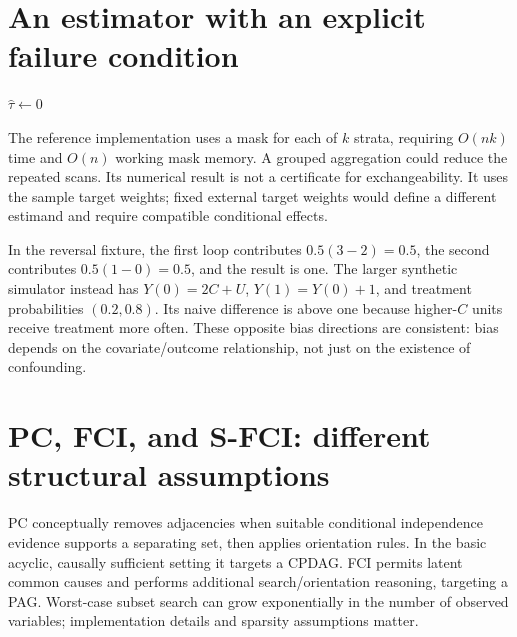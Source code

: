 \documentclass[11pt,oneside]{scrbook}
\begin{document}
\section{An estimator with an explicit failure condition}
\begin{algorithm}[ht]
\caption{Categorical standardization (implemented in Exercise 2)}
$\widehat\tau\gets0$\;
\Return{$\widehat\tau$}\;
\end{algorithm}

The reference implementation uses a mask for each of $k$ strata, requiring
$O(nk)$ time and $O(n)$ working mask memory. A grouped aggregation could reduce
the repeated scans. Its numerical result is not a certificate for exchangeability.
It uses the sample target weights; fixed external target weights would define a
different estimand and require compatible conditional effects.

In the reversal fixture, the first loop contributes $0.5(3-2)=0.5$, the second
contributes $0.5(1-0)=0.5$, and the result is one. The larger synthetic simulator
instead has $Y(0)=2C+U$, $Y(1)=Y(0)+1$, and treatment probabilities $(0.2,0.8)$.
Its naive difference is above one because higher-$C$ units receive treatment more often.
These opposite bias directions are consistent: bias depends on the covariate/outcome
relationship, not just on the existence of confounding.

\section{PC, FCI, and S-FCI: different structural assumptions}
PC conceptually removes adjacencies when suitable conditional independence evidence
supports a separating set, then applies orientation rules. In the basic acyclic,
causally sufficient setting it targets a CPDAG. FCI permits latent common causes and
performs additional search/orientation reasoning, targeting a PAG. Worst-case subset
search can grow exponentially in the number of observed variables; implementation
details and sparsity assumptions matter.
\end{document}
